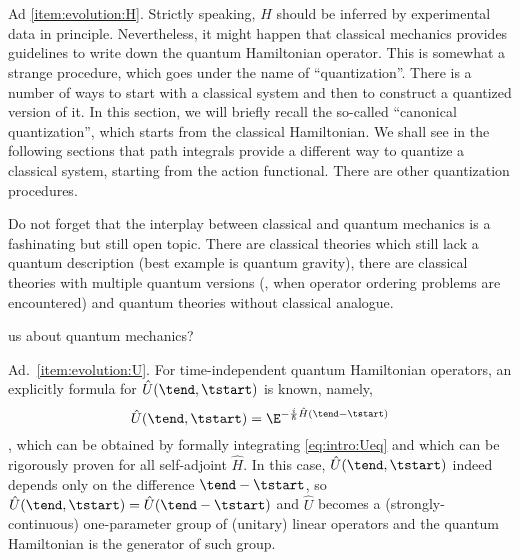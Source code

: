 Ad \cref{item:evolution:H}.   Strictly speaking, $\hat{H}$ should be
inferred by experimental data in principle.  Nevertheless, it might happen
that classical mechanics provides guidelines to write down the quantum
Hamiltonian operator.  This is somewhat a strange procedure, which goes under
the name of ``quantization''.  There is a number of ways
to start with a classical system and then to construct a quantized version of
it.  In this section, we will briefly recall the so-called ``canonical
quantization'', which starts from the classical Hamiltonian. We shall see in the
following sections that path integrals provide a different way to quantize a
classical system, starting from the action functional.  There are other 
quantization procedures.

\begin{remark}

   Do not forget that the interplay between classical and quantum mechanics is a
   fashinating but still open topic.  There are classical theories which still
   lack a quantum description (best example is quantum gravity), there are
   classical theories with multiple quantum versions (\eg, when operator
   ordering problems are encountered) and  quantum theories without classical
   analogue. 
   
   us about quantum mechanics? 


\end{remark}

Ad.~\cref{item:evolution:U}.   For time-independent quantum Hamiltonian operators, an
explicitly formula for $\hat{U}(\tend, \tstart)$ is known, namely,
\begin{dmath}[label={intro:U:exp}]
   \hat{U}(\tend , \tstart) = \E^{ - \frac{i}{\hslash} \hat{H} (\tend-\tstart) }
\end{dmath},
which can be obtained by formally integrating \cref{eq:intro:Ueq} and which can
be rigorously proven for all self-adjoint $\hat{H}$.  In this  case,
$\hat{U}(\tend, \tstart)$ indeed depends only on the difference $\tend-\tstart$,
so $\hat{U}(\tend, \tstart) = \hat{U}(\tend-\tstart)$ and $\hat{U}$ becomes  a
(strongly-continuous) one-parameter  group of (unitary) linear operators and the
quantum Hamiltonian is the generator of such group.


